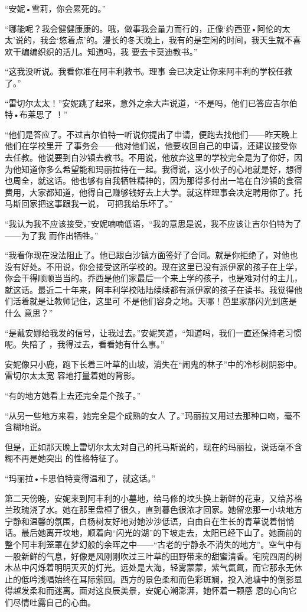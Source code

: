 \documentclass{article}
\begin{document}
“安妮•雪莉，你会累死的。” 

“哪能呢？我会健健康康的。哦，做事我会量力而行的，正像‘约西亚•阿伦的太太’说的，我会‘悠着点’的。漫长的冬天晚上，我有的是空闲的时间，我天生就不喜欢干编编织织的活儿。知道吗，我
要去卡莫迪教书。” 

“这我没听说。我看你准在阿丰利教书。理事
会已决定让你来阿丰利的学校任教了。” 

“雷切尔太太！”安妮跳了起来，意外之余大声说道，“不是吗，他们已答应吉尔伯特•布莱思了
！” 

“他们是答应了。不过吉尔伯特一听说你提出了申请，便跑去找他们——昨天晚上他们在学校里开
\newpage
了事务会——他对他们说，他要收回自己的申请，还建议接受你去任教。他说要到白沙镇去教书。不用说，他放弃这里的学校完全是为了你好，因为他知道你多么希望能和玛丽拉待在一起。我得说，这小伙子的心地就是好，想得也周全，就这话。他也够有自我牺牲精神的，因为那得多付出一笔在白沙镇的食宿费用，大家都知道，他得自己赚够钱好去上大学。就这样理事会决定聘用你了。托马斯回家把这事跟我一说，
可把我给乐坏了。” 

“我认为我不应该接受，”安妮喃喃低语，“我的意思是说，我不应该让吉尔伯特为了——为了我
而作出牺牲。” 

“我看你现在没法阻止了。他已跟白沙镇方面签好了合同。就是你拒绝了，对他也没有好处。不用说，你会接受这所学校的。现在这里已没有派伊家的孩子在上学，你会干得顺顺当当的。乔西是他们家最后一个来上学的孩子，也是难对付的主儿，就这话。最近二十年来，阿丰利学校陆陆续续都有派伊家的孩子在读书。我觉得他们活着就是让教师记住，这里可
\newpage
不是他们容身之地。天哪！芭里家那闪光到底是什么
意思？” 

“是戴安娜给我发的信号，让我过去。”安妮笑道，“知道吗，我们一直还保持老习惯呢。失陪了
，我得过去，看看她有什么事。” 

安妮像只小鹿，跑下长着三叶草的山坡，消失在“闹鬼的林子”中的冷杉树阴影中。雷切尔太太宽
容地打量着她的背影。 


“有的地方她看上去还完全是个孩子。” 

“从另一些地方来看，她完全是个成熟的女人
了。”玛丽拉又用过去那种口吻，毫不含糊地说。 

但是，正如那天晚上雷切尔太太对自己的托马斯说的，现在的玛丽拉，说话毫不含糊不再是她突出
的性格特征了。 

“玛丽拉•卡思伯特变得温和了，就这话。”
\newpage


第二天傍晚，安妮来到阿丰利的小墓地，给马修的坟头换上新鲜的花束，又给苏格兰玫瑰浇了水。她在那里盘桓了很久，直到暮色很浓才回家。她留恋那一小块地方宁静和温馨的氛围，白杨树友好地对她沙沙低语，自由自在生长的青草说着悄悄话。最后她离开坟地，顺着向“闪光的湖”的下坡走去，太阳已经下山了。她面前的整个阿丰利笼罩在梦幻般的余晖之中——“古老的宁静永不消失的地方”。空气中有一股新鲜的气息，好像是风刚刚吹过三叶草的田野带来的甜蜜清香。宅院四周的树木丛中闪烁着明明灭灭的灯光。远处是大海，轻雾蒙蒙，紫气氤氲，而它那永无休止的低吟浅唱始终在耳际萦回。西方的景色柔和而色彩斑斓，投入池塘中的倒影显得越发柔和而迷离。面对这良辰美景，安妮心潮澎湃，她怀着一颗感
恩的心向它们尽情吐露自己的心曲。 
\end{document}

